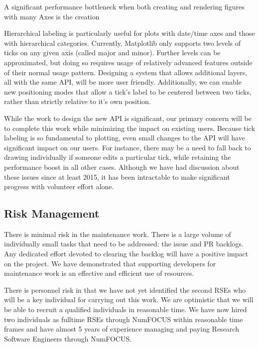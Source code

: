 \documentclass[12pt]{article}
\numberwithin{page}{section}
\begin{document}
A significant performance bottleneck when both creating and rendering figures with many Axes
is the creation

Hierarchical labeling is particularly useful for plots with date/time axes and those with
hierarchical categories.
Currently, Matplotlib only supports two levels of ticks on any given axis (called major
and minor).
Further levels can be approximated, but doing so requires usage of relatively advanced
features outside of their normal usage pattern.
Designing a system that allows additional layers, all with the same API, will be more
user friendly.
Additionally, we can enable new positioning modes that allow a tick's label to be
centered between two ticks, rather than strictly relative to it's own position.

While the work to design the new API is significant, our primary concern will be to
complete this work while minimizing the impact on existing users.
Because tick labeling is so fundamental to plotting, even small changes to the API will
have significant impact on our users.
For instance, there may be a need to fall back to drawing individually if someone edits a
particular tick, while retaining the performance boost in all other cases.
Although we have had discussion about these issues since at least 2015, it has been
intractable to make significant progress with volunteer effort alone.


\subsection{Risk Management}

There is minimal risk in the maintenance work.  There is a large volume
of individually small tasks that need to be addressed: the issue and
PR backlogs.  Any dedicated effort devoted to clearing the backlog
will have a positive impact on the project.  We have demonstrated that
supporting developers for maintenance work is an effective and
efficient use of resources.


There is personnel risk in that we have not yet identified the second RSEs who
will be a key individual for carrying out this work.  We are optimistic that we
will be able to recruit a qualified individuals in reasonable time.  We have
now hired two individuals as fulltime RSEs through NumFOCUS within reasonable
time frames and have almost 5 years of experience managing and paying
Research Software Engineers through NumFOCUS.
\end{document}
